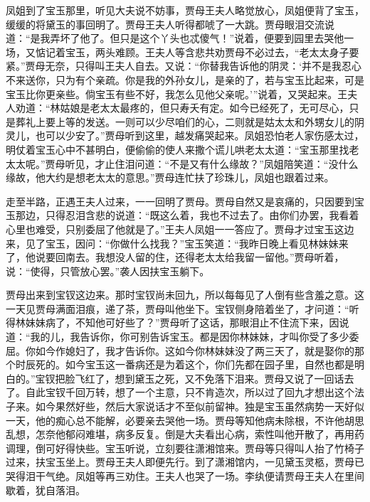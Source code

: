 \begin{parag}
    凤姐到了宝玉那里，听见大夫说不妨事，贾母王夫人略觉放心，凤姐便背了宝玉，缓缓的将黛玉的事回明了。贾母王夫人听得都唬了一大跳。贾母眼泪交流说道：“是我弄坏了他了。但只是这个丫头也忒傻气！”说着，便要到园里去哭他一场，又惦记着宝玉，两头难顾。王夫人等含悲共劝贾母不必过去，“老太太身子要紧。”贾母无奈，只得叫王夫人自去。又说：“你替我告诉他的阴灵：‘并不是我忍心不来送你，只为有个亲疏。你是我的外孙女儿，是亲的了，若与宝玉比起来，可是宝玉比你更亲些。倘宝玉有些不好，我怎么见他父亲呢。’”说着，又哭起来。王夫人劝道：“林姑娘是老太太最疼的，但只寿夭有定。如今已经死了，无可尽心，只是葬礼上要上等的发送。一则可以少尽咱们的心，二则就是姑太太和外甥女儿的阴灵儿，也可以少安了。”贾母听到这里，越发痛哭起来。凤姐恐怕老人家伤感太过，明仗着宝玉心中不甚明白，便偷偷的使人来撒个谎儿哄老太太道：“宝玉那里找老太太呢。”贾母听见，才止住泪问道：“不是又有什么缘故？”凤姐陪笑道：“没什么缘故，他大约是想老太太的意思。”贾母连忙扶了珍珠儿，凤姐也跟着过来。
\end{parag}


\begin{parag}
    走至半路，正遇王夫人过来，一一回明了贾母。贾母自然又是哀痛的，只因要到宝玉那边，只得忍泪含悲的说道：“既这么着，我也不过去了。由你们办罢，我看着心里也难受，只别委屈了他就是了。”王夫人凤姐一一答应了。贾母才过宝玉这边来，见了宝玉，因问：“你做什么找我？”宝玉笑道：“我昨日晚上看见林妹妹来了，他说要回南去。我想没人留的住，还得老太太给我留一留他。”贾母听着，说：“使得，只管放心罢。”袭人因扶宝玉躺下。
\end{parag}


\begin{parag}
    贾母出来到宝钗这边来。那时宝钗尚未回九，所以每每见了人倒有些含羞之意。这一天见贾母满面泪痕，递了茶，贾母叫他坐下。宝钗侧身陪着坐了，才问道：“听得林妹妹病了，不知他可好些了？”贾母听了这话，那眼泪止不住流下来，因说道：“我的儿，我告诉你，你可别告诉宝玉。都是因你林妹妹，才叫你受了多少委屈。你如今作媳妇了，我才告诉你。这如今你林妹妹没了两三天了，就是娶你的那个时辰死的。如今宝玉这一番病还是为着这个，你们先都在园子里，自然也都是明白的。”宝钗把脸飞红了，想到黛玉之死，又不免落下泪来。贾母又说了一回话去了。自此宝钗千回万转，想了一个主意，只不肯造次，所以过了回九才想出这个法子来。如今果然好些，然后大家说话才不至似前留神。独是宝玉虽然病势一天好似一天，他的痴心总不能解，必要亲去哭他一场。贾母等知他病未除根，不许他胡思乱想，怎奈他郁闷难堪，病多反复。倒是大夫看出心病，索性叫他开散了，再用药调理，倒可好得快些。宝玉听说，立刻要往潇湘馆来。贾母等只得叫人抬了竹椅子过来，扶宝玉坐上。贾母王夫人即便先行。到了潇湘馆内，一见黛玉灵柩，贾母已哭得泪干气绝。凤姐等再三劝住。王夫人也哭了一场。李纨便请贾母王夫人在里间歇着，犹自落泪。
\end{parag}


